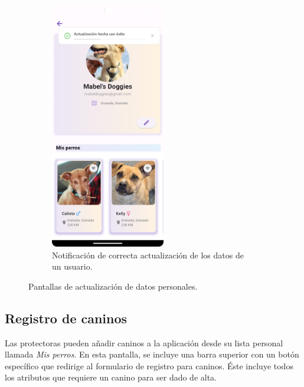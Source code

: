 \documentclass[a4paper, 12pt]{article}
\begin{document}
\begin{figure}[H]
\begin{subfigure}{0.48\textwidth}
\begin{center}
			{\includegraphics[width=5cm]{app/UserUpdateSuccess.png}\par}
			\caption{Notificación de correcta actualización de los datos de un usuario.}
		\end{center}  
	\end{subfigure}\hfill
	\caption{Pantallas de actualización de datos personales.}
\end{figure}


\newpage
\subsection*{Registro de caninos}

Las protectoras pueden añadir caninos a la aplicación desde su lista personal llamada \textit{Mis perros}. En esta pantalla, se incluye una barra superior con un botón específico que redirige al formulario de registro para caninos. Éste incluye todos los atributos que requiere un canino para ser dado de alta.
\end{document}
